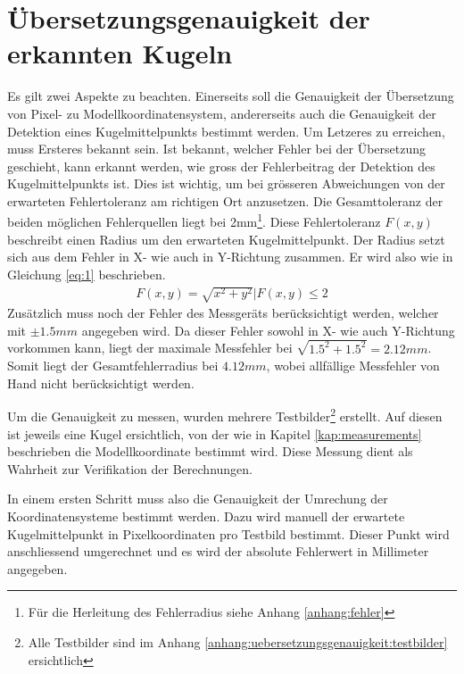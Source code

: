 \section{Übersetzungsgenauigkeit der erkannten Kugeln}\label{kap:uebersetzungsgenauigkeit}
Es gilt zwei Aspekte zu beachten. Einerseits soll die Genauigkeit der Übersetzung von Pixel- zu Modellkoordinatensystem,
andererseits auch die Genauigkeit der Detektion eines Kugelmittelpunkts bestimmt werden.
Um Letzeres zu erreichen, muss Ersteres bekannt sein. Ist bekannt, welcher Fehler bei der Übersetzung geschieht, kann
erkannt werden, wie gross der Fehlerbeitrag der Detektion des Kugelmittelpunkts ist. Dies ist wichtig, um bei
grösseren Abweichungen von der erwarteten Fehlertoleranz am richtigen Ort anzusetzen. Die Gesamttoleranz der beiden
möglichen Fehlerquellen liegt bei 2mm\footnote{Für die Herleitung des Fehlerradius siehe Anhang \ref{anhang:fehler}}. Diese Fehlertoleranz $F(x,y)$ beschreibt einen Radius um den erwarteten Kugelmittelpunkt.
Der Radius setzt sich aus dem Fehler in X- wie auch in Y-Richtung zusammen. Er wird also wie in Gleichung \ref{eq:1} beschrieben.
\begin{align}
    F(x,y) = \sqrt{x^2 + y^2} | F(x,y) \leq 2\label{eq:1}
\end{align}
Zusätzlich muss noch der Fehler des Messgeräts berücksichtigt werden, welcher mit $\pm 1.5mm$ angegeben wird. Da dieser
Fehler sowohl in X- wie auch Y-Richtung vorkommen kann, liegt der maximale Messfehler bei $\sqrt{1.5^2 + 1.5^2} = 2.12mm$. Somit liegt
der Gesamtfehlerradius bei $4.12mm$, wobei allfällige Messfehler von Hand nicht berücksichtigt werden.

Um die Genauigkeit zu messen, wurden mehrere Testbilder\footnote{Alle Testbilder sind im Anhang \ref{anhang:uebersetzungsgenauigkeit:testbilder} ersichtlich}
erstellt. Auf diesen ist jeweils eine Kugel ersichtlich, von der
wie in Kapitel \ref{kap:measurements} beschrieben die Modellkoordinate bestimmt wird. Diese Messung dient als Wahrheit zur
Verifikation der Berechnungen.

In einem ersten Schritt muss also die Genauigkeit der Umrechung der Koordinatensysteme bestimmt werden. Dazu wird
manuell der erwartete Kugelmittelpunkt in Pixelkoordinaten pro Testbild bestimmt. Dieser Punkt wird anschliessend
umgerechnet und es wird der absolute Fehlerwert in Millimeter angegeben.

